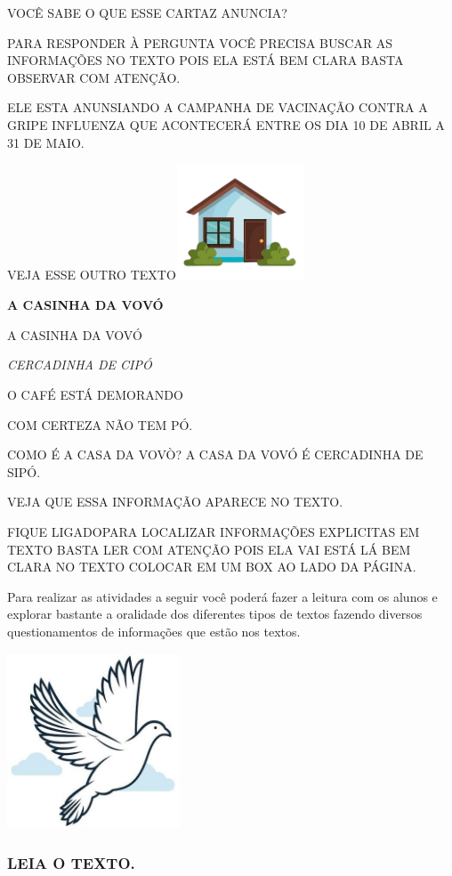 \begin{escola}
VOCÊ SABE O QUE ESSE CARTAZ ANUNCIA?

PARA RESPONDER À PERGUNTA VOCÊ PRECISA BUSCAR AS INFORMAÇÕES NO TEXTO
POIS ELA ESTÁ BEM CLARA BASTA OBSERVAR COM ATENÇÃO.

ELE ESTA ANUNSIANDO A CAMPANHA DE VACINAÇÃO CONTRA A GRIPE INFLUENZA QUE
ACONTECERÁ ENTRE OS DIA 10 DE ABRIL A 31 DE MAIO.

VEJA ESSE OUTRO
TEXTO\includegraphics[width=1.50833in,height=1.35903in]{media/image125.jpg}

\textbf{A CASINHA DA VOVÓ}

A CASINHA DA VOVÓ

\emph{CERCADINHA DE CIPÓ}

O CAFÉ ESTÁ DEMORANDO

COM CERTEZA NÃO TEM PÓ.

COMO É A CASA DA VOVÒ? A CASA DA VOVÓ É CERCADINHA DE SIPÓ.

VEJA QUE ESSA INFORMAÇÃO APARECE NO TEXTO.

FIQUE LIGADOPARA LOCALIZAR INFORMAÇÕES EXPLICITAS EM TEXTO BASTA LER COM
ATENÇÃO POIS ELA VAI ESTÁ LÁ BEM CLARA NO TEXTO COLOCAR EM UM BOX AO
LADO DA PÁGINA.


Para realizar as atividades a seguir você poderá fazer a leitura com os
alunos e explorar bastante a oralidade dos diferentes tipos de textos
fazendo diversos questionamentos de informações que estão nos textos.

\includegraphics[width=2.02153in,height=2.05208in]{media/image126.jpg}

\subsubsection{LEIA O TEXTO.}\label{leia-o-texto.}


\end{escola}

